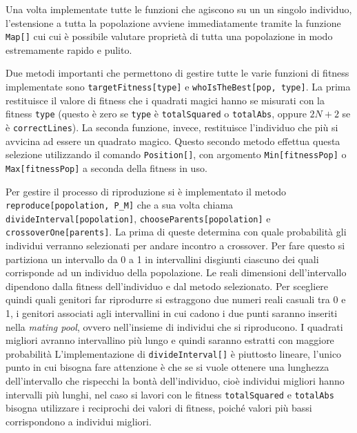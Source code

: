 \documentclass[italian,twoside,twocolumn]{article}
\begin{document}
Una volta implementate tutte le funzioni che agiscono su un un singolo individuo, l'estensione a tutta la popolazione avviene immediatamente tramite la funzione \texttt{Map[]} cui cui è possibile valutare proprietà di tutta una popolazione in modo estremamente rapido e pulito. 

Due metodi importanti che permettono di gestire tutte le varie funzioni di fitness implementate sono \texttt{targetFitness[type]} e \texttt{whoIsTheBest[pop, type]}. La prima restituisce il valore di fitness che i quadrati magici hanno se misurati con la fitness \texttt{type} (questo è zero se \texttt{type} è \texttt{totalSquared} o \texttt{totalAbs}, oppure $ 2 N + 2 $ se è  \texttt{correctLines}). La seconda funzione, invece, restituisce l'individuo che più si avvicina ad essere un quadrato magico. Questo secondo metodo effettua questa selezione utilizzando il comando \texttt{Position[]}, con argomento \texttt{Min[fitnessPop]} o \texttt{Max[fitnessPop]} a seconda della fitness in uso.

Per gestire il processo di riproduzione si è implementato il metodo \texttt{reproduce[popolation, P\_M]} che a sua volta chiama \texttt{divideInterval[popolation]}, \texttt{chooseParents[popolation]} e \texttt{crossoverOne[parents]}. La prima di queste determina con quale probabilità gli individui verranno selezionati per andare incontro a crossover. Per fare questo si partiziona un intervallo da 0 a 1 in intervallini disgiunti ciascuno dei quali corrisponde ad un individuo della popolazione. Le reali dimensioni dell'intervallo dipendono dalla fitness dell'individuo e dal metodo selezionato. Per scegliere quindi quali genitori far riprodurre si estraggono due numeri reali casuali tra 0 e 1, i genitori associati agli intervallini in cui cadono i due punti saranno inseriti nella \emph{mating pool}, ovvero nell'insieme di individui che si riproducono. I quadrati migliori avranno intervallino più lungo e quindi saranno estratti con maggiore probabilità L'implementazione di \texttt{divideInterval[]} è piuttosto lineare, l'unico punto in cui bisogna fare attenzione è che se si vuole ottenere una lunghezza dell'intervallo che rispecchi la bontà dell'individuo, cioè individui migliori hanno intervalli più lunghi, nel caso si lavori con le fitness \texttt{totalSquared} e \texttt{totalAbs} bisogna utilizzare i reciprochi dei valori di fitness, poiché valori più bassi corrispondono a individui migliori.
\end{document}
